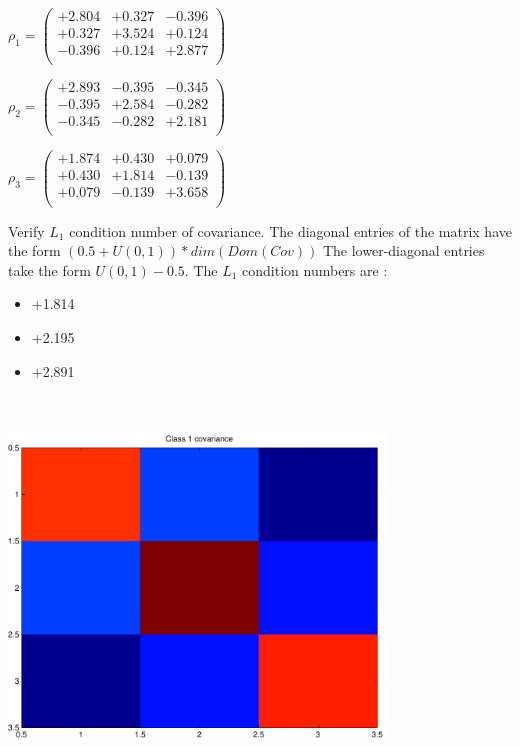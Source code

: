 \documentclass[9pt]{article}
\theoremstyle{plain}
\theoremstyle{definition}
\theoremstyle{remark}
\numberwithin{equation}{section}
\begin{document}
$\rho_1 = \left(
\begin{array}{
ccc}
+2.804 & +0.327 & -0.396 \\
+0.327 & +3.524 & +0.124 \\
-0.396 & +0.124 & +2.877 \\
\end{array}
\right)$ \newline 

$\rho_2 = \left(
\begin{array}{
ccc}
+2.893 & -0.395 & -0.345 \\
-0.395 & +2.584 & -0.282 \\
-0.345 & -0.282 & +2.181 \\
\end{array}
\right)$ \newline 

$\rho_3 = \left(
\begin{array}{
ccc}
+1.874 & +0.430 & +0.079 \\
+0.430 & +1.814 & -0.139 \\
+0.079 & -0.139 & +3.658 \\
\end{array}
\right)$ \newline 

Verify $L_1$ condition number of covariance. The diagonal entries of the matrix have the form $(0.5 + U(0,1) )*dim(Dom(Cov))$
The lower-diagonal entries take the form $U(0,1) - 0.5$. 
The $L_1$ condition numbers are :
\begin{itemize}
\item +1.814
\item +2.195
\item +2.891
\end{itemize}
\includegraphics[width=10.0cm,height=10.0cm]{rv1_corr.pdf}
\end{document}
